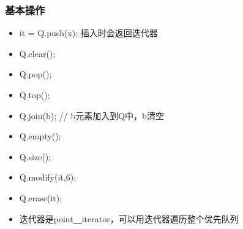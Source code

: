 \subsubsection{基本操作}
\begin{itemize}
\item it = Q.push(x);  插入时会返回迭代器
\item Q.clear(); 
\item Q.pop(); 
\item Q.top();
\item Q.join(b); // b元素加入到Q中，b清空
\item Q.empty();
\item Q.size(); 
\item Q.modify(it,6);
\item Q.erase(it);
\item 迭代器是point\underline{~~}iterator，可以用迭代器遍历整个优先队列
\end{itemize}

